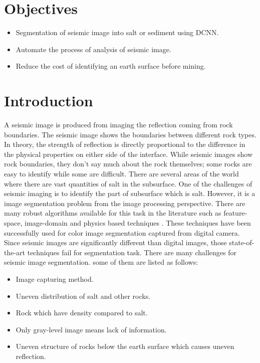 \documentclass[conference]{IEEEtran}
\begin{document}
\section*{Objectives}
\begin{itemize}
	\item  Segmentation of seismic image into salt or sediment using DCNN.
	\item Automate the process of analysis of seismic image.
	\item Reduce the cost of identifying an earth surface before mining.
\end{itemize}

\section{Introduction}
A seismic image is produced from imaging the reflection coming from rock boundaries. The seismic image shows the boundaries between different rock types. In theory, the strength of reflection is directly proportional to the difference in the physical properties on either side of the interface. While seismic images show rock boundaries, they don't say much about the rock themselves; some rocks are easy to identify while some are difficult. There are several areas of the world where there are vast quantities of salt in the subsurface. One of the challenges of seismic imaging is to identify the part of subsurface which is salt. However, it is a image segmentation problem from the image processing perspective. There are many robust algorithms available for this task in the literature such as feature-space, image-domain and  physics based techniques \cite{lucchese2001colour}. These techniques have been successfully used for color image segmentation captured from digital camera. Since seismic images are significantly different than digital images, those state-of-the-art techniques fail for segmentation task. There are many challenges for seismic image segmentation. some of them are listed as follows:
\begin{itemize}
	\item Image capturing method.
	\item Uneven distribution of salt and other rocks.
	\item Rock which have density compared to salt.
	\item Only gray-level image means lack of information.
	\item Uneven structure of rocks below the earth surface which causes uneven reflection. 
\end{itemize}
\end{document}
